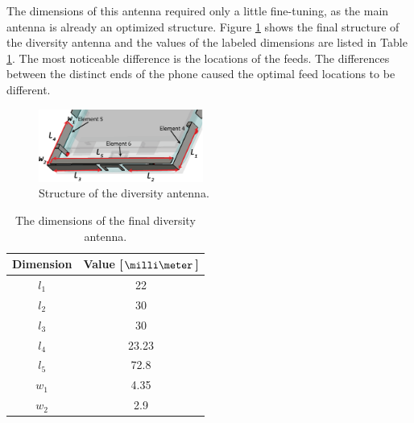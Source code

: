 The dimensions of this antenna required only a little fine-tuning, as the main antenna is already an optimized structure. Figure \ref{fig:div_final} shows the final structure of the diversity antenna and the values of the labeled dimensions are listed in Table \ref{tab:div_final}. The most noticeable difference is the locations of the feeds. The differences between the distinct ends of the phone caused the optimal feed locations to be different. 
\begin{figure}[H]
    \centering
    \includegraphics[width=0.48\textwidth]{img/diversity_final.eps}
    \caption{Structure of the diversity antenna.}
    \vspace{-5pt}
    \label{fig:div_final}
\end{figure}
\begin{table}[H]
    \vspace{-12pt}
    \centering
    \caption{The dimensions of the final diversity antenna.}
    \label{tab:div_final}
    \vspace{-7pt}
    \begin{tabular}{|c|c|}
        \hline
        \textbf{Dimension} & \textbf{Value [$\milli\meter$]}\\
        \hline
        $l_1$ & 22 \\
        \hline
        $l_2$ & 30\\
        \hline
        $l_3$ & 30 \\
        \hline
        $l_4$ & 23.23 \\
        \hline
        $l_5$ & 72.8 \\
        \hline
        $w_1$ & 4.35\\
        \hline
        $w_2$ & 2.9\\
        \hline
    \end{tabular}
\end{table}

